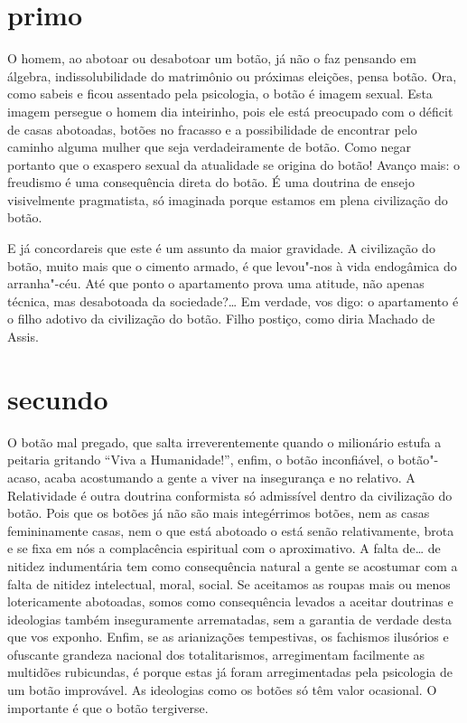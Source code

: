 \section*{primo}

O homem, ao abotoar ou desabotoar um botão, já não o faz pensando em
álgebra, indissolubilidade do matrimônio ou próximas eleições, pensa
botão. Ora, como sabeis e ficou assentado pela psicologia, o botão é
imagem sexual. Esta imagem persegue o homem dia inteirinho, pois ele
está preocupado com o déficit de casas abotoadas, botões no fracasso e a
possibilidade de encontrar pelo caminho alguma mulher que seja
verdadeiramente de botão. Como negar portanto que o exaspero sexual da
atualidade se origina do botão! Avanço mais: o freudismo é uma
consequência direta do botão. É uma doutrina de ensejo visivelmente
pragmatista, só imaginada porque estamos em plena civilização do botão.

E já concordareis que este é um assunto da maior gravidade. A
civilização do botão, muito mais que o cimento armado, é que levou"-nos à
vida endogâmica do arranha"-céu. Até que ponto o apartamento prova uma
atitude, não apenas técnica, mas desabotoada da sociedade?\ldots{} Em
verdade, vos digo: o apartamento é o filho adotivo da civilização do
botão. Filho postiço, como diria Machado de Assis.

\section*{secundo}

O botão mal pregado, que salta irreverentemente quando o milionário
estufa a peitaria gritando ``Viva a Humanidade!'', enfim, o botão
inconfiável, o botão"-acaso, acaba acostumando a gente a viver na
insegurança e no relativo. A Relatividade é outra doutrina conformista
só admissível dentro da civilização do botão. Pois que os botões já não
são mais integérrimos botões, nem as casas femininamente casas, nem o
que está abotoado o está senão relativamente, brota e se fixa em nós a
complacência espiritual com o aproximativo. A falta de\ldots{} de nitidez
indumentária tem como consequência natural a gente se acostumar com a
falta de nitidez intelectual, moral, social. Se aceitamos as roupas mais
ou menos lotericamente abotoadas, somos como consequência levados a
aceitar doutrinas e ideologias também inseguramente arrematadas, sem a
garantia de verdade desta que vos exponho. Enfim, se as arianizações
tempestivas, os fachismos ilusórios e ofuscante grandeza nacional dos
totalitarismos, arregimentam facilmente as multidões rubicundas, é
porque estas já foram arregimentadas pela psicologia de um botão
improvável. As ideologias como os botões só têm valor ocasional. O
importante é que o botão tergiverse.

